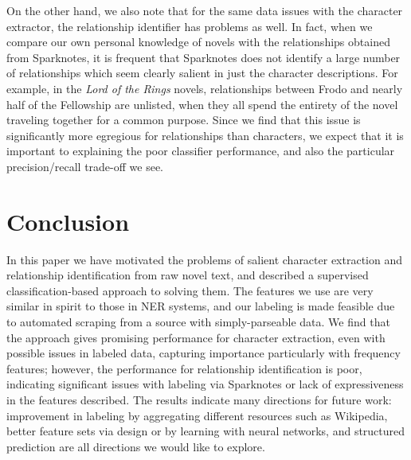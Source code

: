 \documentclass[12pt]{article}
\begin{document}
        On the other hand, we also note that for the same data issues with the character extractor,
        the relationship identifier has problems as well. In fact, when we compare our own personal
        knowledge of novels with the relationships obtained from Sparknotes, it is frequent that
        Sparknotes does not identify a large number of relationships which seem clearly salient in
        just the character descriptions. For example, in the \emph{Lord of the Rings} novels,
        relationships between Frodo and nearly half of the Fellowship are unlisted, when they all
        spend the entirety of the novel traveling together for a common purpose. Since we find that
        this issue is significantly more egregious for relationships than characters, we expect
        that it is important to explaining the poor classifier performance, and also the particular precision/recall trade-off we see.

\section{Conclusion}

    In this paper we have motivated the problems of salient character extraction and relationship
    identification from raw novel text, and described a supervised classification-based approach to
    solving them. The features we use are very similar in spirit to those in NER systems,
    and our labeling is made feasible due to automated scraping from a source with simply-parseable
    data. We find that the approach gives promising performance for character extraction,
    even with possible issues in labeled data, capturing importance particularly with frequency
    features; however, the performance for relationship identification is poor, indicating
    significant issues with labeling via Sparknotes or lack of expressiveness in the features
    described. The results indicate many directions for future work: improvement in labeling
    by aggregating different resources such as Wikipedia, better feature sets via design or by
    learning with neural networks, and structured prediction are all directions we would like
    to explore.



\end{document}
